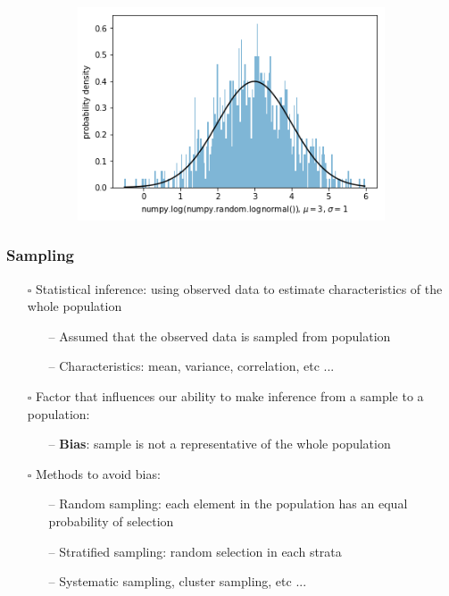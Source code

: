 \documentclass[handout]{beamer}
\begin{document}
\begin{frame}
\begin{figure}
    \begin{subfigure}{0.5\textwidth}
        \centering
        \includegraphics[width=.9\textwidth]{log2.png}
    \end{subfigure}
    \end{figure}
\end{frame}

\begin{frame}
    \frametitle{Sampling}
    \vspace{-8pt}
    \begin{itemize}[wide = 0pt]
        \item[$\square$] Statistical inference: using observed data to estimate characteristics of the whole population
        \begin{itemize}
            \item[--] Assumed that the observed data is sampled from population
            \item[--] Characteristics: mean, variance, correlation, etc ...
        \end{itemize}
        \item[$\square$] Factor that influences our ability to make inference from a sample to a population:
        \begin{itemize}
            \item[--] \textbf{Bias}: sample is not a representative of the whole population
        \end{itemize}
        \item[$\square$] Methods to avoid bias:
        \begin{itemize}
            \item[--] Random sampling: each element in the population has an equal probability of selection
            \item[--] Stratified sampling: random selection in each strata
            \item[--] Systematic sampling, cluster sampling, etc ...
        \end{itemize}
    \end{itemize}
    \vspace*{\fill}
\end{frame}
\end{document}
